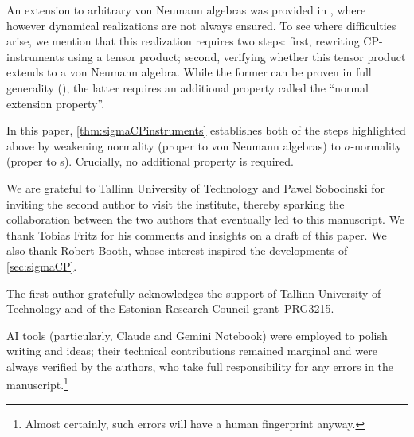 \begin{itemize}
	An extension to arbitrary von Neumann algebras was provided in \cite{okamura2015measurement}, where however dynamical realizations are not always ensured. 
	To see where difficulties arise, we mention that this realization requires two steps: first, rewriting CP-instruments using a tensor product; second, verifying whether this tensor product extends to a von Neumann algebra. While the former can be proven in full generality (\cite[Proposition 3.3]{okamura2015measurement}), the latter requires an additional property called the ``normal extension property''.

	In this paper, \cref{thm:sigmaCPinstruments} establishes both of the steps highlighted above by weakening normality (proper to von Neumann algebras) to $\sigma$-normality (proper to \cstars{}s). 
	Crucially, no additional property is required.
\end{itemize}
\begin{paperacknowledgments}
We are grateful to Tallinn University of Technology and Pawel Sobocinski for inviting the second author to visit the institute, thereby sparking the collaboration between the two authors that eventually led to this manuscript.
We thank Tobias Fritz for his comments and insights on a draft of this paper.
We also thank Robert Booth, whose interest inspired the developments of \cref{sec:sigmaCP}.
\begin{paperfunding}
{The first author gratefully acknowledges the support of Tallinn University of Technology and of the Estonian Research Council grant~PRG3215.}
\end{paperfunding}
AI tools (particularly, Claude and Gemini Notebook) were employed to polish writing and ideas; their technical contributions remained marginal and were always verified by the authors, who take full responsibility for any errors in the manuscript.\footnote{Almost certainly, such errors will have a human fingerprint anyway.}
\end{paperacknowledgments}
